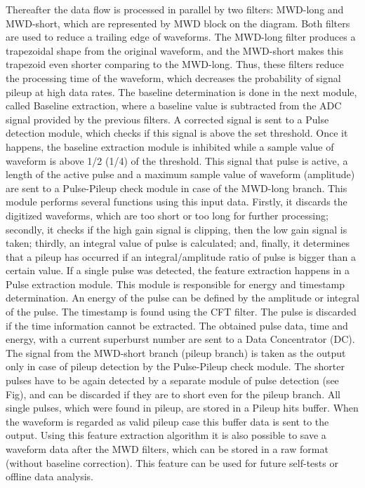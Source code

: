 \documentclass[12pt,a4paper, twocolumn]{article}
\begin{document}
 Thereafter the data flow is processed in parallel by two filters: MWD-long and MWD-short, which are represented by MWD block on the diagram. Both filters are used to reduce a trailing edge of waveforms. The MWD-long filter produces a trapezoidal shape from the original waveform, and the MWD-short makes this trapezoid even shorter comparing to the MWD-long. Thus, these filters  reduce the processing time of the waveform, which decreases the probability of signal pileup at high data rates. The baseline determination is done in the next module, called Baseline extraction, where a baseline value is subtracted from the ADC signal provided by the previous filters. 
A corrected signal is sent to a Pulse detection module, which checks if this signal is above the set threshold. Once it happens, the baseline extraction module is inhibited while a sample value of waveform is above 1/2 (1/4) of the threshold. This signal that pulse is active, a length of the active pulse and a maximum sample value of waveform (amplitude) are sent to a Pulse-Pileup check module in case of the MWD-long branch. This module performs several functions using this input data. Firstly, it discards the digitized waveforms, which are too short or too long for further processing; secondly, it checks if the high gain signal is clipping, then the low gain signal is taken; thirdly, an integral value of pulse is calculated; and, finally, it determines that a pileup has occurred if an integral/amplitude ratio of pulse is bigger than a certain value. If a single pulse was detected, the feature extraction happens in a Pulse extraction module. This module is responsible for energy and timestamp determination. An energy of the pulse can be defined by the amplitude or integral of the pulse. The timestamp is found using the CFT filter. The pulse is discarded if the time information cannot be extracted. The obtained pulse data, time and energy, with a current superburst number are sent to a Data Concentrator (DC). 
The signal from the MWD-short branch (pileup branch) is taken as the output only in case of pileup detection by the Pulse-Pileup check module. The shorter pulses have to be again detected by a separate module of pulse detection (see Fig), and can be discarded if they are to short even for the pileup branch. All single pulses, which were found in pileup, are stored in a Pileup hits buffer. When the waveform is regarded as valid pileup case this buffer data is sent to the output.
	Using this feature extraction algorithm it is also possible to save a waveform data after the MWD filters, which can be stored in a raw format (without baseline correction). This feature can be used for  future self-tests or offline data analysis.
\end{document}
